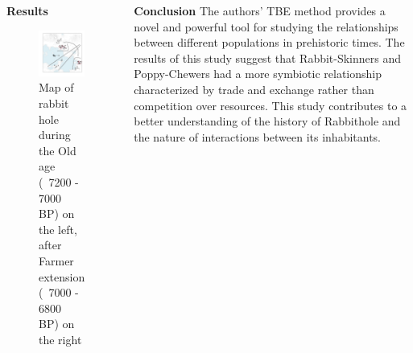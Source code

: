 \documentclass[final]{beamer}
\begin{document}
\begin{frame}[t]
\begin{columns}[t]
\begin{block}{\textbf{Results}}
            \begin{figure}
                \label{fig:twomaps}
                \centering
                \includegraphics[width=.4\textwidth]{all_gpe}
                \caption{Map of rabbit hole during the Old age (~7200 - 7000 BP) on the left, after Farmer extension  (~7000 - 6800 BP) on the right }
            \end{figure}

        \end{block}

    \vfill
    \begin{block}{\textbf{Conclusion}}
            The authors' TBE method provides a novel and powerful tool for studying the relationships between different populations in prehistoric times. The results of this study suggest that Rabbit-Skinners and Poppy-Chewers had a more symbiotic relationship characterized by trade and exchange rather than competition over resources. This study contributes to a better understanding of the history of Rabbithole and the nature of interactions between its inhabitants.
        \end{block}


\end{columns}
\end{frame}
\end{document}
